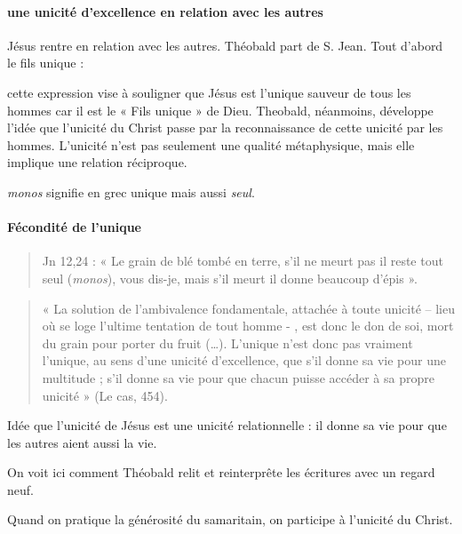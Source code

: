  




\paragraph{une unicité d'excellence en relation avec les autres} Jésus rentre en relation avec les autres. Théobald part de S. Jean. Tout d'abord le fils unique : 
\begin{Def}
    cette expression vise à souligner que Jésus est l’unique sauveur de tous
les hommes car il est le « Fils unique » de Dieu. Theobald, néanmoins, développe l’idée que
l’unicité du Christ passe par la reconnaissance de cette unicité par les hommes. L’unicité n’est
pas seulement une qualité métaphysique, mais elle implique une relation réciproque.
\end{Def}
 
\textit{monos} signifie en grec unique mais aussi \textit{seul}. 

\paragraph{Fécondité de l'unique} 
\begin{quote}
    Jn 12,24 : « Le grain de blé tombé en terre, s’il ne meurt pas il reste tout seul (\textit{monos}), vous dis-je, mais s’il meurt il donne beaucoup d’épis ». 
\end{quote}

\begin{quote}
    « La solution de l’ambivalence fondamentale, attachée à toute unicité – lieu où se loge l’ultime tentation de tout homme - , est donc le don de soi, mort du grain pour porter du fruit (…). L’unique n’est donc pas vraiment l’unique, au sens d’une unicité d’excellence, que s’il donne sa vie pour une multitude ; s’il donne sa vie pour que chacun puisse accéder à sa propre unicité » (Le cas, 454).
\end{quote}
Idée que l'unicité de Jésus est une unicité relationnelle : il donne sa vie pour que les autres aient aussi la vie. 

On voit ici comment Théobald relit et reinterprête les écritures avec un regard neuf. 

\begin{Prop}
    Quand on pratique la générosité du samaritain, on participe à l'unicité du Christ. 
\end{Prop}



